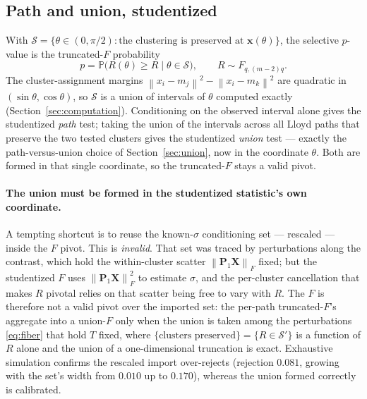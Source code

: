 \documentclass[11pt]{article}
\newcommand{\Prob}{\mathbb{P}}
\newcommand{\X}{\mathbf{X}}
\newcommand{\x}{\mathbf{x}}
\newcommand{\Sset}{\mathcal{S}}
\newcommand{\Pp}{\mathbf{P}}
\newcommand{\norm}[1]{\left\lVert #1 \right\rVert}
\newcommand{\Fnorm}[1]{\left\lVert #1 \right\rVert_F}
\begin{document}
\subsection{Path and union, studentized}
With $\Sset = \{\theta\in(0,\pi/2):\text{the clustering is preserved at }\x(\theta)\}$,
the selective $p$-value is the truncated-$F$ probability
\begin{equation}
  p = \Prob\big(R(\theta)\ge R \mid \theta\in\Sset\big),
  \qquad R\sim F_{q,(m-2)q}.
\end{equation}
The cluster-assignment margins $\norm{x_i-m_j}^2-\norm{x_i-m_k}^2$ are quadratic
in $(\sin\theta,\cos\theta)$, so $\Sset$ is a union of intervals of $\theta$
computed exactly (Section~\ref{sec:computation}). Conditioning on the observed
interval alone gives the studentized \emph{path} test; taking the union of the
intervals across all Lloyd paths that preserve the two tested clusters gives the
studentized \emph{union} test --- exactly the path-versus-union choice of
Section~\ref{sec:union}, now in the coordinate $\theta$. Both are formed in that
single coordinate, so the truncated-$F$ stays a valid pivot.

\paragraph{The union must be formed in the studentized statistic's own coordinate.}
A tempting shortcut is to reuse the known-$\sigma$ conditioning set --- rescaled ---
inside the $F$ pivot. This is \emph{invalid}. That set was traced by perturbations
along the contrast, which hold the within-cluster scatter $\Fnorm{\Pp_1\X}$ fixed;
but the studentized $F$ uses $\Fnorm{\Pp_1\X}^2$ to estimate $\sigma$, and the
per-cluster cancellation that makes $R$ pivotal relies on that scatter being free
to vary with $R$. The $F$ is therefore not a valid pivot over the imported set:
the per-path truncated-$F$'s aggregate into a union-$F$ only when the union is
taken among the perturbations \eqref{eq:fiber} that hold $T$ fixed, where
$\{\text{clusters preserved}\}=\{R\in\Sset'\}$ is a function of $R$ alone and the
union of a one-dimensional truncation is exact. Exhaustive simulation confirms the
rescaled import over-rejects (rejection $0.081$, growing with the set's width from
$0.010$ up to $0.170$), whereas the union formed correctly is calibrated.
\end{document}
